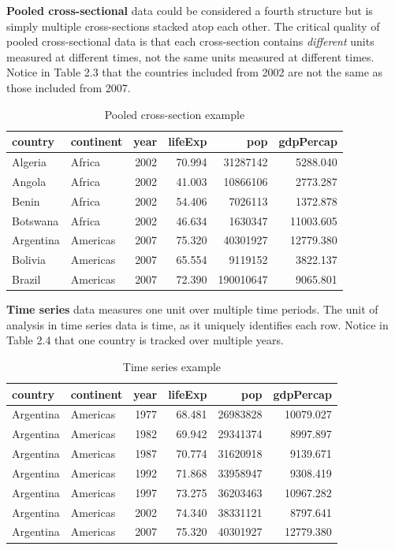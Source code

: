 \documentclass[
]{book}
\begin{document}
\textbf{Pooled cross-sectional} data could be considered a fourth structure but is simply multiple cross-sections stacked atop each other. The critical quality of pooled cross-sectional data is that each cross-section contains \emph{different} units measured at different times, not the same units measured at different times. Notice in Table 2.3 that the countries included from 2002 are not the same as those included from 2007.

\begin{table}

\caption{\label{tab:pooled}Pooled cross-section example}
\centering
\begin{tabular}[t]{l|l|r|r|r|r}
\hline
country & continent & year & lifeExp & pop & gdpPercap\\
\hline
Algeria & Africa & 2002 & 70.994 & 31287142 & 5288.040\\
\hline
Angola & Africa & 2002 & 41.003 & 10866106 & 2773.287\\
\hline
Benin & Africa & 2002 & 54.406 & 7026113 & 1372.878\\
\hline
Botswana & Africa & 2002 & 46.634 & 1630347 & 11003.605\\
\hline
Argentina & Americas & 2007 & 75.320 & 40301927 & 12779.380\\
\hline
Bolivia & Americas & 2007 & 65.554 & 9119152 & 3822.137\\
\hline
Brazil & Americas & 2007 & 72.390 & 190010647 & 9065.801\\
\hline
\end{tabular}
\end{table}

\textbf{Time series} data measures one unit over multiple time periods. The unit of analysis in time series data is time, as it uniquely identifies each row. Notice in Table 2.4 that one country is tracked over multiple years.

\begin{table}

\caption{\label{tab:timeseries}Time series example}
\centering
\begin{tabular}[t]{l|l|r|r|r|r}
\hline
country & continent & year & lifeExp & pop & gdpPercap\\
\hline
Argentina & Americas & 1977 & 68.481 & 26983828 & 10079.027\\
\hline
Argentina & Americas & 1982 & 69.942 & 29341374 & 8997.897\\
\hline
Argentina & Americas & 1987 & 70.774 & 31620918 & 9139.671\\
\hline
Argentina & Americas & 1992 & 71.868 & 33958947 & 9308.419\\
\hline
Argentina & Americas & 1997 & 73.275 & 36203463 & 10967.282\\
\hline
Argentina & Americas & 2002 & 74.340 & 38331121 & 8797.641\\
\hline
Argentina & Americas & 2007 & 75.320 & 40301927 & 12779.380\\
\hline
\end{tabular}
\end{table}
\end{document}
